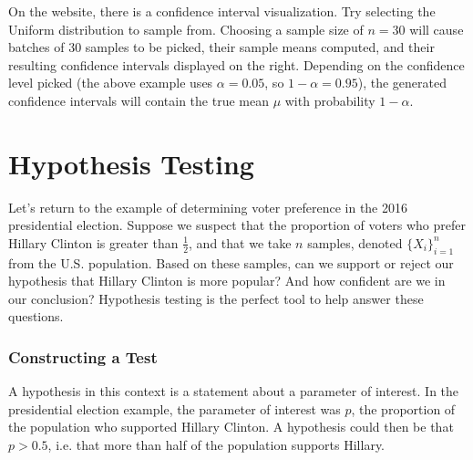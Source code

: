 \documentclass{tufte-book}
\theoremstyle{definition}
\numberwithin{theorem}{section}
\numberwithin{definition}{section}
\numberwithin{lemma}{section}
\numberwithin{corollary}{section}
\numberwithin{proposition}{section}
\numberwithin{remark}{section}
\numberwithin{claim}{section}
\numberwithin{observation}{section}
\numberwithin{fact}{section}
\numberwithin{assumption}{section}
\numberwithin{example}{section}
\numberwithin{exercise}{section}
\begin{document}
On the website, there is a confidence interval visualization. Try selecting the Uniform distribution to sample from. Choosing a sample size of $n = 30$ will cause batches of 30 samples to be picked, their sample means computed, and their resulting confidence intervals displayed on the right. Depending on the confidence level picked (the above example uses $\alpha = 0.05$, so $1-\alpha = 0.95$), the generated confidence intervals will contain the true mean $\mu$ with probability $1-\alpha$.


\chapter{Hypothesis Testing}
Let's return to the example of determining voter preference in the 2016 presidential election. Suppose we suspect that the proportion of voters who prefer Hillary Clinton is greater than $\frac{1}{2}$, and that we take $n$ samples, denoted $\{X_i\}_{i=1}^n$ from the U.S. population. Based on these samples, can we support or reject our hypothesis that Hillary Clinton is more popular? And how confident are we in our conclusion? Hypothesis testing is the perfect tool to help answer these questions.

\subsection{Constructing a Test}
A hypothesis in this context is a statement about a parameter of interest. In the presidential election example, the parameter of interest was $p$, the proportion of the population who supported Hillary Clinton. A hypothesis could then be that $p > 0.5$, i.e. that more than half of the population supports Hillary.
\end{document}
